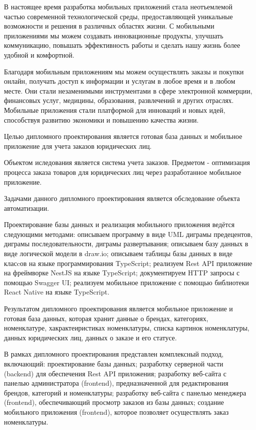 
В настоящее время разработка мобильных приложений стала неотъемлемой частью современной технологической среды,
предоставляющей уникальные возможности и решения в различных областях жизни.
С мобильными приложениями мы можем создавать инновационные продукты, улучшать коммуникацию,
повышать эффективность работы и сделать нашу жизнь более удобной и комфортной.

Благодаря мобильным приложениям мы можем осуществлять заказы и покупки онлайн,
получать доступ к информации и услугам в любое время и в любом месте.
Они стали незаменимыми инструментами в сфере электронной коммерции, финансовых услуг,
медицины, образования, развлечений и других отраслях. Мобильные приложения стали платформой для инноваций и новых идей,
способствуя развитию экономики и повышению качества жизни.

Целью дипломного проектирования является готовая база данных и мобильное приложение
для учета заказов юридических лиц.

Объектом иследования является система учета заказов.
Предметом - оптимизация процесса заказа товаров для юридических лиц
через разработанное мобильное приложение.

Задачами данного дипломного проектирования является обследование объекта автоматизации.

Проектирование базы данных и реализация мобильного приложения ведётся следующими методами:
описываем программу в виде UML диграмы предецентов, диграмы последовательности, диграмы развертывания;
описываем базу данных в виде логической модели в draw.io;
описываем таблицы базы данных в виде класcов на языке программирования TypeScript;
реализуем Rest API приложение на фреймворке NestJS на языке TypeScript;
документируем HTTP запросы с помощью Swagger UI;
реализуем мобильное приложение с помощью библиотеки React Native на языке TypeScript.

Результатом дипломного проектирования является мобильное приложение и готовая база данных,
которая хранит данные о брендах, категориях, номенклатуре,
хакрактеиристиках номенклатуры,
списка картинок номенклатуры,
данных юридических лиц,
данных о заказе и его статусе.

В рамках дипломного проектирования представлен комплексный подход,
включающий:
проектирование базы данных;
разработку серверной части (backend) для обеспечения Rest API приложения;
разработку веб-сайта с панелью администратора (frontend), предназначенной для редактирования брендов, категорий и номенклатуры;
разработку веб-сайта с панелью менеджера (frontend), обеспечивающий просмотр заказов из базы данных;
создание мобильного приложения (frontend),
которое позволяет осуществлять заказ номенклатуры.

